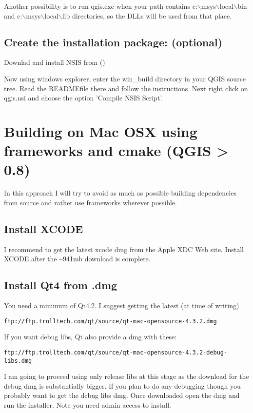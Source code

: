 Another possibility is to run qgis.exe when your path contains
c:$\backslash$msys$\backslash$local$\backslash$bin and c:$\backslash$msys$\backslash$local$\backslash$lib directories, so the DLLs will be
used from that place.

\subsection{Create the installation package: (optional)}
Downlad and install NSIS from ()

Now using windows explorer, enter the win\_build directory in your QGIS source
tree. Read the READMEfile there and follow the instructions. Next right click
on qgis.nsi and choose the option 'Compile NSIS Script'. 


\section{Building on Mac OSX using frameworks and cmake (QGIS > 0.8)}\label{sec:install_macosx}
In this approach I will try to avoid as much as possible building dependencies
from source and rather use frameworks wherever possible.

\subsection{Install XCODE}
I recommend to get the latest xcode dmg from the Apple XDC Web site. Install
XCODE after the \~{}941mb download is complete.

\subsection{Install Qt4 from .dmg}
You need a minimum of Qt4.2. I suggest getting the latest (at time of writing).

\begin{verbatim}
ftp://ftp.trolltech.com/qt/source/qt-mac-opensource-4.3.2.dmg
\end{verbatim}

If you want debug libs, Qt also provide a dmg with these:

\begin{verbatim}
ftp://ftp.trolltech.com/qt/source/qt-mac-opensource-4.3.2-debug-libs.dmg
\end{verbatim}

I am going to proceed using only release libs at this stage as the download for
the debug dmg is substantially bigger. If you plan to do any debugging though
you probably want to get the debug libs dmg. Once downloaded open the dmg and
run the installer. Note you need admin access to install.

